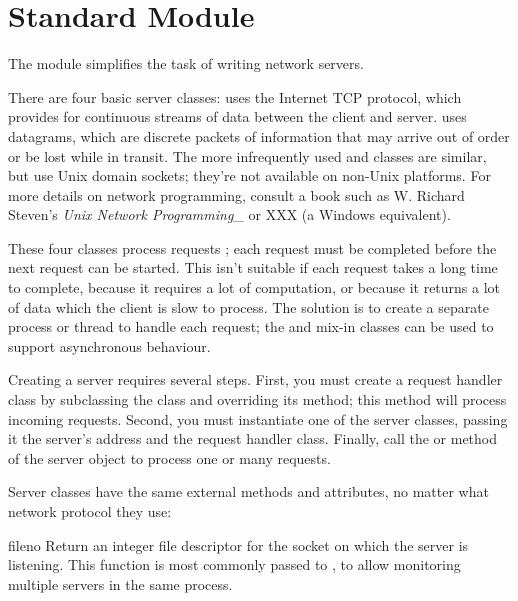 \section{Standard Module }

The  module simplifies the task of writing network
servers.  

There are four basic server classes:  uses the
Internet TCP protocol, which provides for continuous streams of data
between the client and server.   uses datagrams, which
are discrete packets of information that may arrive out of order or be
lost while in transit.  The more infrequently used
 and  classes are
similar, but use Unix domain sockets; they're not available on
non-Unix platforms.  For more details on network programming, consult
a book such as W. Richard Steven's \emph{Unix Network Programming}_ or
XXX (a Windows equivalent).

These four classes process requests ; each request
must be completed before the next request can be started.  This isn't
suitable if each request takes a long time to complete, because it
requires a lot of computation, or because it returns a lot of data
which the client is slow to process.  The solution is to create a
separate process or thread to handle each request; the
 and  mix-in classes can be
used to support asynchronous behaviour.

Creating a server requires several steps.  First, you must create a
request handler class by subclassing the 
class and overriding its  method; this method will
process incoming requests.  Second, you must instantiate one of the
server classes, passing it the server's address and the request
handler class.  Finally, call the  or
 method of the server object to process one or
many requests.

Server classes have the same external methods and attributes, no
matter what network protocol they use:

\renewcommand{\indexsubitem}{(in module SocketServer)}


\begin{funcdesc}{fileno}{}
Return an integer file descriptor for the socket on which the server
is listening.  This function is most commonly passed to
, to allow monitoring multiple servers in the
same process.
\end{funcdesc}

